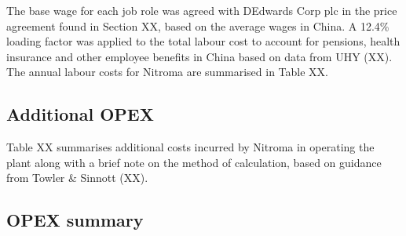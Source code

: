 The base wage for each job role was agreed with DEdwards Corp plc in the price agreement found in Section XX, based on the average wages in China. A 12.4\% loading factor was applied to the total labour cost to account for pensions, health insurance and other employee benefits in China based on data from UHY (XX). The annual labour costs for Nitroma are summarised in Table XX.

\subsection{Additional OPEX}
Table XX summarises additional costs incurred by Nitroma in operating the plant along with a brief note on the method of calculation, based on guidance from Towler & Sinnott (XX).

\subsection{OPEX summary}